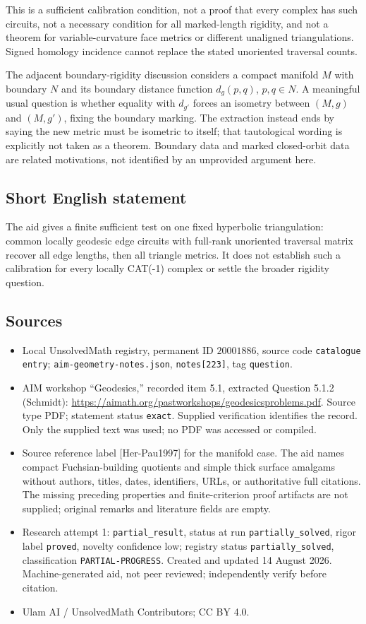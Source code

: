 \documentclass[11pt]{article}
\begin{document}
This is a sufficient calibration condition, not a proof that every complex has such circuits, not a necessary condition for all marked-length rigidity, and not a theorem for variable-curvature face metrics or different unaligned triangulations. Signed homology incidence cannot replace the stated unoriented traversal counts.

The adjacent boundary-rigidity discussion considers a compact manifold \(M\) with boundary \(N\) and its boundary distance function \(d_g(p,q)\), \(p,q\in N\). A meaningful usual question is whether equality with \(d_{g'}\) forces an isometry between \((M,g)\) and \((M,g')\), fixing the boundary marking. The extraction instead ends by saying the new metric must be isometric to itself; that tautological wording is explicitly not taken as a theorem. Boundary data and marked closed-orbit data are related motivations, not identified by an unprovided argument here.
\subsection{Short English statement}
The aid gives a finite sufficient test on one fixed hyperbolic triangulation: common locally geodesic edge circuits with full-rank unoriented traversal matrix recover all edge lengths, then all triangle metrics. It does not establish such a calibration for every locally CAT(-1) complex or settle the broader rigidity question.
\subsection{Sources}
\begin{itemize}
\item Local UnsolvedMath registry, permanent ID \(20001886\), source code \texttt{catalogue entry}; \texttt{aim-geometry-notes.json}, \texttt{notes[223]}, tag \texttt{question}.
\item AIM workshop ``Geodesics,'' recorded item 5.1, extracted Question 5.1.2 (Schmidt): \url{https://aimath.org/pastworkshops/geodesicsproblems.pdf}. Source type PDF; statement status \texttt{exact}. Supplied verification identifies the record. Only the supplied text was used; no PDF was accessed or compiled.
\item Source reference label [Her-Pau1997] for the manifold case. The aid names compact Fuchsian-building quotients and simple thick surface amalgams without authors, titles, dates, identifiers, URLs, or authoritative full citations. The missing preceding properties and finite-criterion proof artifacts are not supplied; original remarks and literature fields are empty.
\item Research attempt 1: \texttt{partial\_result}, status at run \texttt{partially\_solved}, rigor label \texttt{proved}, novelty confidence low; registry status \texttt{partially\_solved}, classification \texttt{PARTIAL-PROGRESS}. Created and updated 14 August 2026. Machine-generated aid, not peer reviewed; independently verify before citation.
\item Ulam AI / UnsolvedMath Contributors; CC BY 4.0.
\end{itemize}
\end{document}

